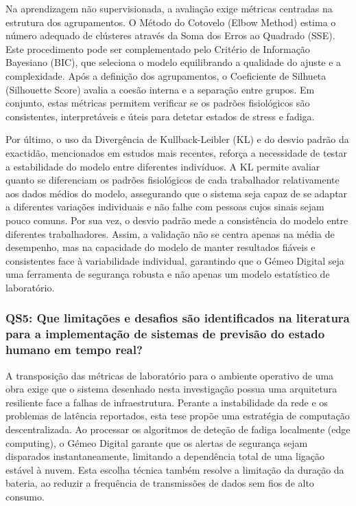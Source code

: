 Na aprendizagem não supervisionada, a avaliação exige métricas centradas na estrutura dos agrupamentos. O Método do Cotovelo (Elbow Method) estima o número adequado de clústeres através da Soma dos Erros ao Quadrado (SSE). Este procedimento pode ser complementado pelo Critério de Informação Bayesiano (BIC), que seleciona o modelo equilibrando a qualidade do ajuste e a complexidade. Após a definição dos agrupamentos, o Coeficiente de Silhueta (Silhouette Score) avalia a coesão interna e a separação entre grupos. Em conjunto, estas métricas permitem verificar se os padrões fisiológicos são consistentes, interpretáveis e úteis para detetar estados de stress e fadiga.

Por último, o uso da Divergência de Kullback-Leibler (KL) e do desvio padrão da exactidão, mencionados em estudos mais recentes, reforça a necessidade de testar a estabilidade do modelo entre diferentes indivíduos. A KL permite avaliar quanto se diferenciam os padrões fisiológicos de cada trabalhador relativamente aos dados médios do modelo, assegurando que o sistema seja capaz de se adaptar a diferentes variações individuais e não falhe com pessoas cujos sinais sejam pouco comuns. Por sua vez, o desvio padrão mede a consistência do modelo entre diferentes trabalhadores. Assim, a validação não se centra apenas na média de desempenho, mas na capacidade do modelo de manter resultados fiáveis e consistentes face à variabilidade individual, garantindo que o Gémeo Digital seja uma ferramenta de segurança robusta e não apenas um modelo estatístico de laboratório.

\subsubsection*{QS5: Que limitações e desafios são identificados na literatura para a implementação de sistemas de previsão do estado humano em tempo real?}
\label{subsubsec:qs5_analisis}

A transposição das métricas de laboratório para o ambiente operativo de uma obra exige que o sistema desenhado nesta investigação possua uma arquitetura resiliente face a falhas de infraestrutura. Perante a instabilidade da rede e os problemas de latência reportados, esta tese propõe uma estratégia de computação descentralizada. Ao processar os algoritmos de deteção de fadiga localmente (edge computing), o Gémeo Digital garante que os alertas de segurança sejam disparados instantaneamente, limitando a dependência total de uma ligação estável à nuvem. Esta escolha técnica também resolve a limitação da duração da bateria, ao reduzir a frequência de transmissões de dados sem fios de alto consumo.

